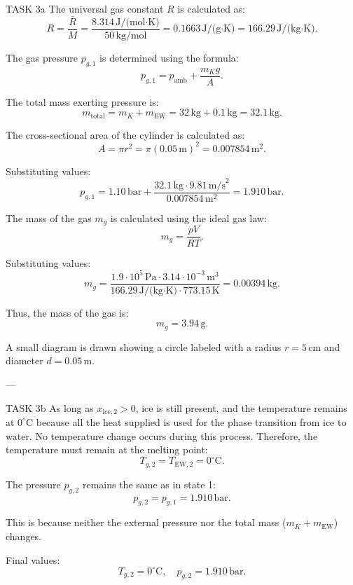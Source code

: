 TASK 3a  
The universal gas constant \( R \) is calculated as:  
\[
R = \frac{\bar{R}}{M} = \frac{8.314 \, \text{J/(mol·K)}}{50 \, \text{kg/mol}} = 0.1663 \, \text{J/(g·K)} = 166.29 \, \text{J/(kg·K)}.
\]

The gas pressure \( p_{g,1} \) is determined using the formula:  
\[
p_{g,1} = p_{\text{amb}} + \frac{m_K g}{A}.
\]

The total mass exerting pressure is:  
\[
m_{\text{total}} = m_K + m_{\text{EW}} = 32 \, \text{kg} + 0.1 \, \text{kg} = 32.1 \, \text{kg}.
\]

The cross-sectional area of the cylinder is calculated as:  
\[
A = \pi r^2 = \pi (0.05 \, \text{m})^2 = 0.007854 \, \text{m}^2.
\]

Substituting values:  
\[
p_{g,1} = 1.10 \, \text{bar} + \frac{32.1 \, \text{kg} \cdot 9.81 \, \text{m/s}^2}{0.007854 \, \text{m}^2} = 1.910 \, \text{bar}.
\]

The mass of the gas \( m_g \) is calculated using the ideal gas law:  
\[
m_g = \frac{p V}{R T}.
\]

Substituting values:  
\[
m_g = \frac{1.9 \cdot 10^5 \, \text{Pa} \cdot 3.14 \cdot 10^{-3} \, \text{m}^3}{166.29 \, \text{J/(kg·K)} \cdot 773.15 \, \text{K}} = 0.00394 \, \text{kg}.
\]

Thus, the mass of the gas is:  
\[
m_g = 3.94 \, \text{g}.
\]

A small diagram is drawn showing a circle labeled with a radius \( r = 5 \, \text{cm} \) and diameter \( d = 0.05 \, \text{m} \).

---

TASK 3b  
As long as \( x_{\text{ice},2} > 0 \), ice is still present, and the temperature remains at \( 0^\circ\text{C} \) because all the heat supplied is used for the phase transition from ice to water. No temperature change occurs during this process. Therefore, the temperature must remain at the melting point:  
\[
T_{g,2} = T_{\text{EW},2} = 0^\circ\text{C}.
\]

The pressure \( p_{g,2} \) remains the same as in state 1:  
\[
p_{g,2} = p_{g,1} = 1.910 \, \text{bar}.
\]

This is because neither the external pressure nor the total mass (\( m_K + m_{\text{EW}} \)) changes.  

Final values:  
\[
T_{g,2} = 0^\circ\text{C}, \quad p_{g,2} = 1.910 \, \text{bar}.
\]